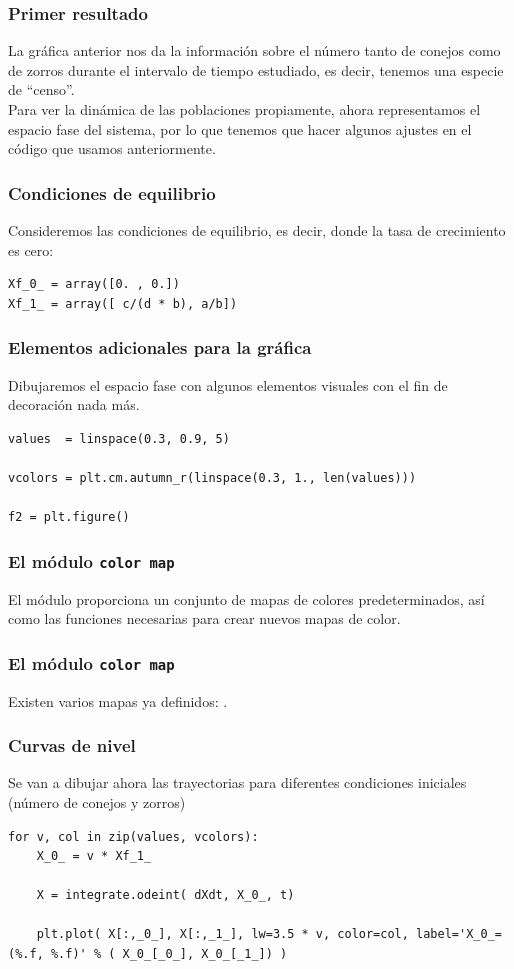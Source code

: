 \begin{frame}
\frametitle{Primer resultado}
La gráfica anterior nos da la información sobre el número tanto de conejos como de zorros durante el intervalo de tiempo estudiado, es decir, tenemos una especie de \enquote{censo}.
\\
\medskip
Para ver la dinámica de las poblaciones propiamente, ahora representamos el espacio fase del sistema, por lo que tenemos que hacer algunos ajustes en el código que usamos anteriormente.
\end{frame}
\begin{frame}[fragile]
\frametitle{Condiciones de equilibrio}
Consideremos las condiciones de equilibrio, es decir, donde la tasa de crecimiento es cero:
\begin{lstlisting}[caption=Condiciones de equilibrio, style=FormattedNumber, basicstyle=\linespread{1.1}\ttfamily=\small, columns=fullflexible]
Xf_0_ = array([0. , 0.])
Xf_1_ = array([ c/(d * b), a/b])
\end{lstlisting}
\end{frame}
\begin{frame}[fragile]
\frametitle{Elementos adicionales para la gráfica}
Dibujaremos el espacio fase con algunos elementos visuales con el fin de decoración nada más.
\begin{lstlisting}[caption=Obteniendo los colores, style=FormattedNumber, basicstyle=\linespread{1.1}\ttfamily=\small, columns=fullflexible]
values  = linspace(0.3, 0.9, 5)                         

vcolors = plt.cm.autumn_r(linspace(0.3, 1., len(values)))  

f2 = plt.figure()
\end{lstlisting}
\end{frame}
\begin{frame}[fragile]
\frametitle{El módulo \texttt{color map}}
El módulo  proporciona un conjunto de mapas de colores predeterminados, así como las funciones necesarias para crear nuevos mapas de color.
\end{frame}
\begin{frame}[fragile]
\frametitle{El módulo \texttt{color map}}
Existen varios mapas ya definidos: .
\end{frame}
\begin{frame}
\frametitle{Curvas de nivel}
Se van a dibujar ahora las trayectorias para diferentes condiciones iniciales (número de conejos y zorros)
\begin{lstlisting}[caption=Graficando las curvas de nivel, style=FormattedNumber, basicstyle=\linespread{1.1}\ttfamily=\small, columns=fullflexible]
for v, col in zip(values, vcolors):
    X_0_ = v * Xf_1_
    
    X = integrate.odeint( dXdt, X_0_, t)

    plt.plot( X[:,_0_], X[:,_1_], lw=3.5 * v, color=col, label='X_0_=(%.f, %.f)' % ( X_0_[_0_], X_0_[_1_]) )
\end{lstlisting}
\end{frame}
